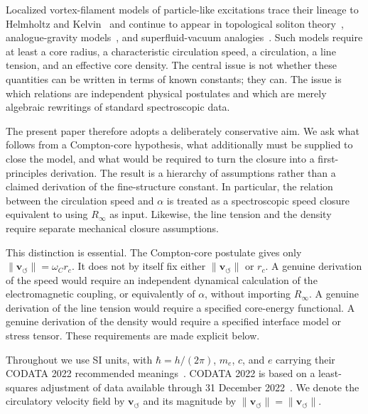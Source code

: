 \documentclass[aps,pra,preprint,longbibliography,nofootinbib]{revtex4-2}
\newcommand{\vnorm}{\lVert\mathbf{v}_{\!\boldsymbol{\circlearrowleft}}\rVert} %
\begin{document}
Localized vortex-filament models of particle-like excitations trace
their lineage to Helmholtz and Kelvin~\cite{Helmholtz1867,Kelvin1867}
and continue to appear in topological soliton theory~\cite{FaddeevNiemi1997},
analogue-gravity models~\cite{Barcelo2005}, and superfluid-vacuum
analogies~\cite{Volovik2003}.  Such models require at least a core
radius, a characteristic circulation speed, a circulation, a line
tension, and an effective core density.  The central issue is not
whether these quantities can be written in terms of known constants;
they can.  The issue is which relations are independent physical
postulates and which are merely algebraic rewritings of standard
spectroscopic data.

The present paper therefore adopts a deliberately conservative aim.  We
ask what follows from a Compton-core hypothesis, what additionally must
be supplied to close the model, and what would be required to turn the
closure into a first-principles derivation.  The result is a hierarchy of
assumptions rather than a claimed derivation of the fine-structure
constant.  In particular, the relation between the circulation speed and
$\alpha$ is treated as a spectroscopic speed closure equivalent to using
$R_\infty$ as input.  Likewise, the line tension and the density require
separate mechanical closure assumptions.

This distinction is essential.  The Compton-core postulate gives only
$\lVert \mathbf{v}_{\!\boldsymbol{\circlearrowleft}}\rVert=\omega_C r_c$.
It does not by itself fix either
$\lVert \mathbf{v}_{\!\boldsymbol{\circlearrowleft}}\rVert$ or $r_c$.
A genuine derivation of the speed would require an independent dynamical
calculation of the electromagnetic coupling, or equivalently of
$\alpha$, without importing $R_\infty$.  A genuine derivation of the line
tension would require a specified core-energy functional.  A genuine
derivation of the density would require a specified interface model or
stress tensor.  These requirements are made explicit below.

Throughout we use SI units, with $\hbar=h/(2\pi)$, $m_e$, $c$, and $e$
carrying their CODATA 2022 recommended meanings~\cite{MohrTaylor2022}.
CODATA 2022 is based on a least-squares adjustment of data available
through 31 December 2022~\cite{MohrTaylor2022}.  We denote the
circulatory velocity field by $\mathbf{v}_{\!\boldsymbol{\circlearrowleft}}$
and its magnitude by
$\vnorm=\lVert \mathbf{v}_{\!\boldsymbol{\circlearrowleft}}\rVert$.

\end{document}
